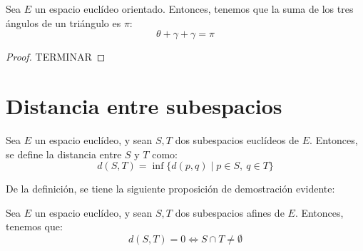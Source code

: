 \begin{teo}
    Sea $E$ un espacio euclídeo orientado. Entonces, tenemos que la suma de los tres ángulos de un triángulo es $\pi$:
    \begin{equation*}
        \theta + \gamma + \gamma = \pi
    \end{equation*}
    \begin{figure}[H]
        \centering
    \end{figure}
\end{teo}
\begin{proof}
    TERMINAR
\end{proof}



\section{Distancia entre subespacios}
\begin{definicion}
    Sea $E$ un espacio euclídeo, y sean $S,T$ dos subespacios euclídeos de $E$. Entonces, se define la distancia entre $S$ y $T$ como:
    \begin{equation*}
        d(S,T) = \inf\{d(p,q)\mid p\in S,~q\in T\}
    \end{equation*}
\end{definicion}

De la definición, se tiene la siguiente proposición de demostración evidente:
\begin{prop}
    Sea $E$ un espacio euclídeo, y sean $S,T$ dos subespacios afines de $E$. Entonces, tenemos que:
    \begin{equation*}
        d(S,T)=0 \Longleftrightarrow S\cap T \neq \emptyset
    \end{equation*}
\end{prop}



